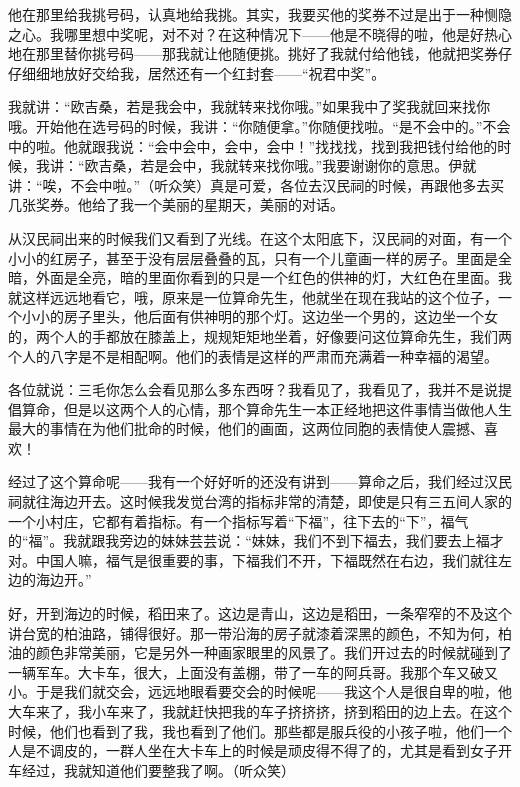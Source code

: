 \par 他在那里给我挑号码，认真地给我挑。其实，我要买他的奖券不过是出于一种恻隐之心。我哪里想中奖呢，对不对？在这种情况下——他是不晓得的啦，他是好热心地在那里替你挑号码——那我就让他随便挑。挑好了我就付给他钱，他就把奖券仔仔细细地放好交给我，居然还有一个红封套——“祝君中奖”。
\par 我就讲：“欧吉桑，若是我会中，我就转来找你哦。”如果我中了奖我就回来找你哦。开始他在选号码的时候，我讲：“你随便拿。”你随便找啦。“是不会中的。”不会中的啦。他就跟我说：“会中会中，会中，会中！”找找找，找到我把钱付给他的时候，我讲：“欧吉桑，若是会中，我就转来找你哦。”我要谢谢你的意思。伊就讲：“唉，不会中啦。”（听众笑）真是可爱，各位去汉民祠的时候，再跟他多去买几张奖券。他给了我一个美丽的星期天，美丽的对话。
\par 从汉民祠出来的时候我们又看到了光线。在这个太阳底下，汉民祠的对面，有一个小小的红房子，甚至于没有层层叠叠的瓦，只有一个儿童画一样的房子。里面是全暗，外面是全亮，暗的里面你看到的只是一个红色的供神的灯，大红色在里面。我就这样远远地看它，哦，原来是一位算命先生，他就坐在现在我站的这个位子，一个小小的房子里头，他后面有供神明的那个灯。这边坐一个男的，这边坐一个女的，两个人的手都放在膝盖上，规规矩矩地坐着，好像要问这位算命先生，我们两个人的八字是不是相配啊。他们的表情是这样的严肃而充满着一种幸福的渴望。
\par 各位就说：三毛你怎么会看见那么多东西呀？我看见了，我看见了，我并不是说提倡算命，但是以这两个人的心情，那个算命先生一本正经地把这件事情当做他人生最大的事情在为他们批命的时候，他们的画面，这两位同胞的表情使人震撼、喜欢！
\par 经过了这个算命呢——我有一个好好听的还没有讲到——算命之后，我们经过汉民祠就往海边开去。这时候我发觉台湾的指标非常的清楚，即使是只有三五间人家的一个小村庄，它都有着指标。有一个指标写着“下福”，往下去的“下”，福气的“福”。我就跟我旁边的妹妹芸芸说：“妹妹，我们不到下福去，我们要去上福才对。中国人嘛，福气是很重要的事，下福我们不开，下福既然在右边，我们就往左边的海边开。”
\par 好，开到海边的时候，稻田来了。这边是青山，这边是稻田，一条窄窄的不及这个讲台宽的柏油路，铺得很好。那一带沿海的房子就漆着深黑的颜色，不知为何，柏油的颜色非常美丽，它是另外一种画家眼里的风景了。我们开过去的时候就碰到了一辆军车。大卡车，很大，上面没有盖棚，带了一车的阿兵哥。我那个车又破又小。于是我们就交会，远远地眼看要交会的时候呢——我这个人是很自卑的啦，他大车来了，我小车来了，我就赶快把我的车子挤挤挤，挤到稻田的边上去。在这个时候，他们也看到了我，我也看到了他们。那些都是服兵役的小孩子啦，他们一个人是不调皮的，一群人坐在大卡车上的时候是顽皮得不得了的，尤其是看到女子开车经过，我就知道他们要整我了啊。（听众笑）
